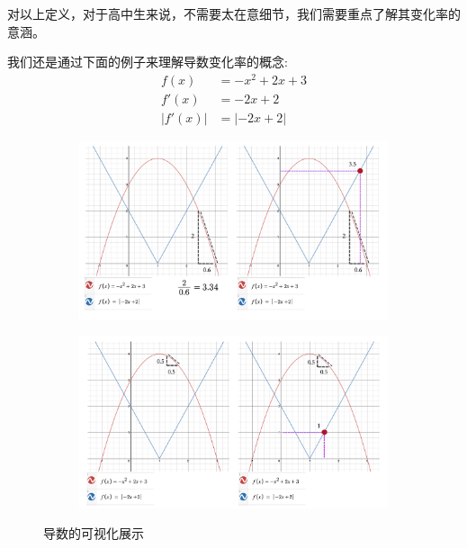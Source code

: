 \documentclass[12pt]{article}
\numberwithin{figure}{section}
\newenvironment{fullmodel}{
			\smallskip\noindent
			\begin{minipage}{\textwidth+\marginparwidth+\marginparsep}\smallskip\smallskip}
			{\smallskip\smallskip\end{minipage}\vspace{.1in}
			}
\numberwithin{equation}{section}
\begin{document}
\begin{remark}
对以上定义，对于高中生来说，不需要太在意细节，我们需要重点了解其变化率的意涵。	
\end{remark}
\begin{example}
我们还是通过下面的例子来理解导数变化率的概念:
\begin{align*}
	f(x) & = -x^2 + 2x + 3 \\
	f'(x) & = -2x + 2 \\
	|f'(x) | & = |-2x + 2| 
\end{align*}	
\end{example}
\begin{fullmodel}
	\begin{figure}[H]
		\centering
		\begin{subfigure}[b]{0.45\textwidth}
		\centering
		\includegraphics[width=\textwidth]{fig/C2C2derivativeE1}	
		\end{subfigure}
		\begin{subfigure}[b]{0.46\textwidth}
		\centering
		\includegraphics[width=\textwidth]{fig/C2C2derivativeE2}	
		\end{subfigure}
		\caption{导数的可视化展示}
	\end{figure}
\end{fullmodel}
\end{document}
